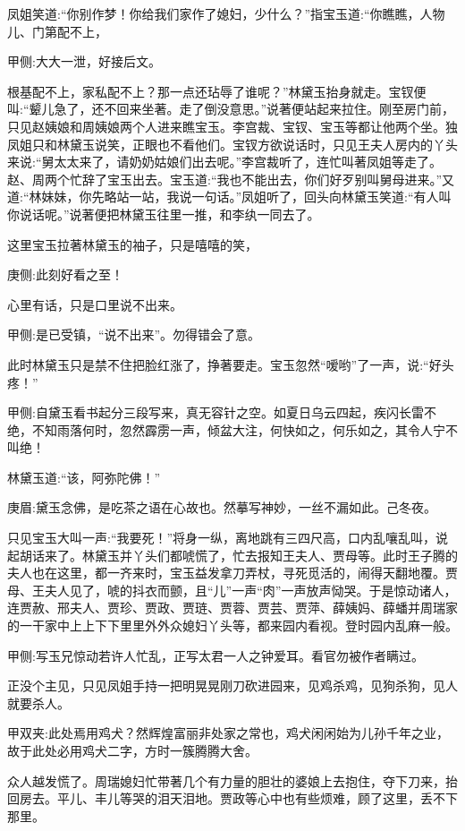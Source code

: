 \begin{parag}
    凤姐笑道:“你别作梦！你给我们家作了媳妇，少什么？”指宝玉道:“你瞧瞧，人物儿、门第配不上，\begin{note}甲侧:大大一泄，好接后文。\end{note}根基配不上，家私配不上？那一点还玷辱了谁呢？”林黛玉抬身就走。宝钗便叫:“颦儿急了，还不回来坐著。走了倒没意思。”说著便站起来拉住。刚至房门前，只见赵姨娘和周姨娘两个人进来瞧宝玉。李宫裁、宝钗、宝玉等都让他两个坐。独凤姐只和林黛玉说笑，正眼也不看他们。宝钗方欲说话时，只见王夫人房内的丫头来说:“舅太太来了，请奶奶姑娘们出去呢。”李宫裁听了，连忙叫著凤姐等走了。赵、周两个忙辞了宝玉出去。宝玉道:“我也不能出去，你们好歹别叫舅母进来。”又道:“林妹妹，你先略站一站，我说一句话。”凤姐听了，回头向林黛玉笑道:“有人叫你说话呢。”说著便把林黛玉往里一推，和李纨一同去了。
\end{parag}


\begin{parag}
    这里宝玉拉著林黛玉的袖子，只是嘻嘻的笑，\begin{note}庚侧:此刻好看之至！\end{note}心里有话，只是口里说不出来。\begin{note}甲侧:是已受镇，“说不出来”。勿得错会了意。\end{note}此时林黛玉只是禁不住把脸红涨了，挣著要走。宝玉忽然“嗳哟”了一声，说:“好头疼！”\begin{note}甲侧:自黛玉看书起分三段写来，真无容针之空。如夏日乌云四起，疾闪长雷不绝，不知雨落何时，忽然霹雳一声，倾盆大注，何快如之，何乐如之，其令人宁不叫绝！\end{note}林黛玉道:“该，阿弥陀佛！”\begin{note}庚眉:黛玉念佛，是吃茶之语在心故也。然摹写神妙，一丝不漏如此。己冬夜。\end{note}只见宝玉大叫一声:“我要死！”将身一纵，离地跳有三四尺高，口内乱嚷乱叫，说起胡话来了。林黛玉并丫头们都唬慌了，忙去报知王夫人、贾母等。此时王子腾的夫人也在这里，都一齐来时，宝玉益发拿刀弄杖，寻死觅活的，闹得天翻地覆。贾母、王夫人见了，唬的抖衣而颤，且“儿”一声“肉”一声放声恸哭。于是惊动诸人，连贾赦、邢夫人、贾珍、贾政、贾琏、贾蓉、贾芸、贾萍、薛姨妈、薛蟠并周瑞家的一干家中上上下下里里外外众媳妇丫头等，都来园内看视。登时园内乱麻一般。\begin{note}甲侧:写玉兄惊动若许人忙乱，正写太君一人之钟爱耳。看官勿被作者瞒过。\end{note}正没个主见，只见凤姐手持一把明晃晃刚刀砍进园来，见鸡杀鸡，见狗杀狗，见人就要杀人。\begin{note}甲双夹:此处焉用鸡犬？然辉煌富丽非处家之常也，鸡犬闲闲始为儿孙千年之业，故于此处必用鸡犬二字，方时一簇腾腾大舍。\end{note}众人越发慌了。周瑞媳妇忙带著几个有力量的胆壮的婆娘上去抱住，夺下刀来，抬回房去。平儿、丰儿等哭的泪天泪地。贾政等心中也有些烦难，顾了这里，丢不下那里。
\end{parag}


